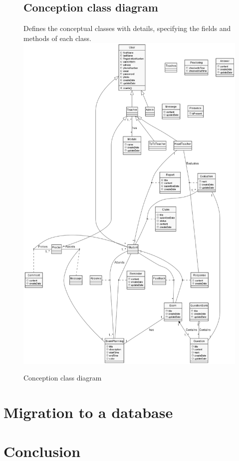 \documentclass[]{uc2pfecaneva}
\begin{document}
    \begin{figure}
        \subsection{Conception class diagram}
        \raggedright Defines the conceptual classes with details, specifying the fields and methods of each class.
        \linebreak
        \includegraphics[width=350pt]{images/CCD}
        \caption{Conception class diagram}
    \end{figure}
    \clearpage

    \raggedright\section{Migration to a database}
    \raggedright\section{Conclusion}
\end{document}
